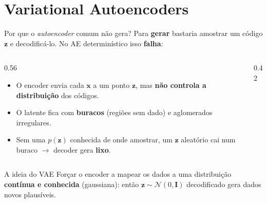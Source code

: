 \documentclass[aspectratio=169,xcolor=dvipsnames]{beamer}
\begin{document}
  \section{Variational Autoencoders}

  \begin{frame}{Por que o \textit{autoencoder} comum não gera?}
    Para \textbf{gerar} bastaria amostrar um código $\mathbf{z}$ e decodificá-lo.
    No AE determinístico isso \textbf{falha}:
    \begin{columns}[T]
      \begin{column}{0.56\textwidth}
        \begin{itemize}
          \item O encoder envia cada $\mathbf{x}$ a um ponto $\mathbf{z}$, mas \textbf{não
          controla a distribuição} dos códigos.
          \item O latente fica com \textbf{buracos} (regiões sem dado) e
          aglomerados irregulares.
          \item Sem uma $p(\mathbf{z})$ conhecida de onde amostrar, um $\mathbf{z}$
          aleatório cai num buraco $\to$ decoder gera \textbf{lixo}.
        \end{itemize}
      \end{column}
      \begin{column}{0.42\textwidth}
        \centering
      \end{column}
    \end{columns}
    \begin{block}{A ideia do VAE}
      Forçar o encoder a mapear os dados a uma distribuição \textbf{contínua
      e conhecida} (gaussiana): então $\mathbf{z}\sim\mathcal{N}(0,\mathbf{I})$ decodificado
      gera dados novos plausíveis.
    \end{block}
  \end{frame}
\end{document}
